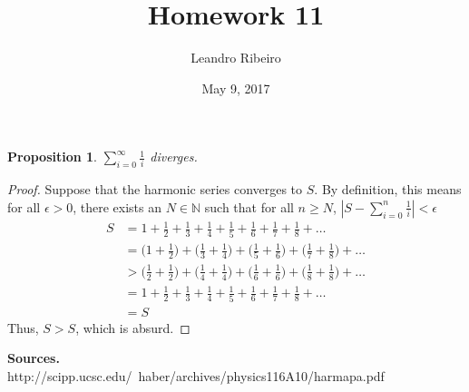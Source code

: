 \documentclass[12pt]{amsart}
\newcommand{\N}{\mathbb{N}}
\begin{document}
\title{Homework 11}
\date{May 9, 2017}
\author{Leandro Ribeiro}

\maketitle

\newtheorem*{prop}{Proposition}

\begin{prop}
	$\displaystyle{\sum\limits_{i=0}^{\infty}\frac{1}{i}}$ diverges.
\end{prop}

\begin{proof}
	Suppose that the harmonic series converges to $S$. By definition, this means for all $\epsilon > 0$, there exists an $N \in \N$ such that for all $n \geq N$, $|S - \sum\limits_{i=0}^{n}\frac{1}{i}| < \epsilon$
	\begin{equation*}
	\begin{split}
	S &= 1 + \frac{1}{2} + \frac{1}{3} + \frac{1}{4} + \frac{1}{5} + \frac{1}{6} + \frac{1}{7} + \frac{1}{8} + \dots
	 \\ &= \Bigg(1 + \frac{1}{2}\Bigg) + \Bigg(\frac{1}{3} + \frac{1}{4}\Bigg) + \Bigg(\frac{1}{5} + \frac{1}{6}\Bigg) + \Bigg(\frac{1}{7} + \frac{1}{8}\Bigg) + \dots
	 \\ &> \Bigg(\frac{1}{2} + \frac{1}{2}\Bigg) + \Bigg(\frac{1}{4} + \frac{1}{4}\Bigg) + \Bigg(\frac{1}{6} + \frac{1}{6}\Bigg) + \Bigg(\frac{1}{8} + \frac{1}{8}\Bigg) + \dots
	 \\ &= 1 + \frac{1}{2} + \frac{1}{3} + \frac{1}{4} + \frac{1}{5} + \frac{1}{6} + \frac{1}{7} + \frac{1}{8} + \dots
	 \\ &= S
	\end{split}
	\end{equation*}
	\indent Thus, $S > S$, which is absurd.
\end{proof}

\noindent\textbf{Sources.}
\\http://scipp.ucsc.edu/~haber/archives/physics116A10/harmapa.pdf
\end{document}

